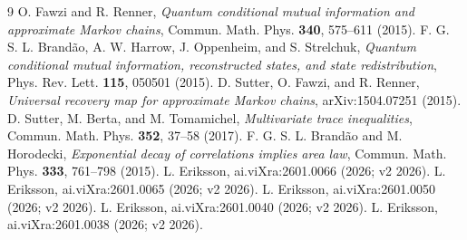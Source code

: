 \documentclass[11pt]{article}
\begin{document}
\begin{thebibliography}{9}
 O. Fawzi and R. Renner, \emph{Quantum conditional mutual
information and approximate Markov chains}, Commun. Math. Phys.
\textbf{340}, 575--611 (2015).
 F. G. S. L. Brand\~ao, A. W. Harrow, J. Oppenheim, and
S. Strelchuk, \emph{Quantum conditional mutual information,
reconstructed states, and state redistribution}, Phys. Rev. Lett.
\textbf{115}, 050501 (2015).
 D. Sutter, O. Fawzi, and R. Renner, \emph{Universal
recovery map for approximate Markov chains}, arXiv:1504.07251 (2015).
 D. Sutter, M. Berta, and M. Tomamichel,
\emph{Multivariate trace inequalities}, Commun. Math. Phys.
\textbf{352}, 37--58 (2017).
 F. G. S. L. Brand\~ao and M. Horodecki, \emph{Exponential
decay of correlations implies area law}, Commun. Math. Phys.
\textbf{333}, 761--798 (2015).
 L. Eriksson, ai.viXra:2601.0066 (2026; v2 2026).
 L. Eriksson, ai.viXra:2601.0065 (2026; v2 2026).
 L. Eriksson, ai.viXra:2601.0050 (2026; v2 2026).
 L. Eriksson, ai.viXra:2601.0040 (2026; v2 2026).
 L. Eriksson, ai.viXra:2601.0038 (2026; v2 2026).
\end{thebibliography}
\end{document}
